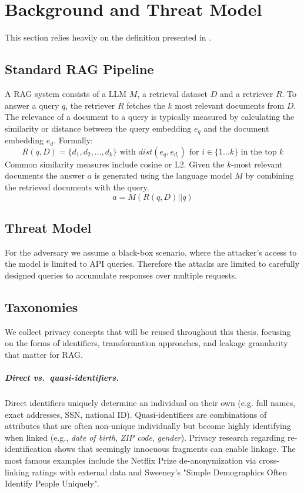 \chapter{Background and Threat Model}\label{chapter:background}
This section relies heavily on the definition presented in \cite{goodAndBad}.

\section{Standard RAG Pipeline}
A \ac{RAG} system consists of a \ac{LLM} $M$, a retrieval dataset $D$ and a retriever $R$. To answer a query $q$, the retriever $R$ fetches the $k$ most relevant documents from $D$. The relevance of a document to a query is typically measured by calculating the similarity or distance between the query embedding $e_q$ and the document embedding $e_d$. Formally:
\[R(q,D) = \{d_1,d_2,..., d_k\} \mbox{ with } dist(e_q, e_{d_i}) \mbox{ for } i \in \{1...k\} \mbox{ in the top } k\]
Common similarity measures include cosine or L2. Given the $k$-most relevant documents the answer $a$ is generated using the language model $M$ by combining the retrieved documents with the query. $$a = M(R(q,D)\vert\vert q)$$

\section{Threat Model}\label{background-sec:threat-model}
For the adversary we assume a black-box scenario, where the attacker's access to the model is limited to API queries. Therefore the attacks are limited to carefully designed queries to accumulate responses over multiple requests.

\section{Taxonomies}
We collect privacy concepts that will be reused throughout this thesis, focusing on the forms of identifiers, transformation approaches, and leakage granularity that matter for \ac{RAG}.

\paragraph{Direct vs.\ quasi-identifiers.}
Direct identifiers uniquely determine an individual on their own (e.g. full names, exact addresses, SSN, national ID). Quasi-identifiers are combinations of attributes that are often non-unique individually but become highly identifying when linked (e.g., \textit{date of birth}, \textit{ZIP code}, \textit{gender}). Privacy research regarding re-identification shows that seemingly innocuous fragments can enable linkage. The most famous examples include the Netflix Prize de-anonymization via cross-linking ratings with external data and Sweeney's "Simple Demographics Often Identify People Uniquely". \cite{netflixDeAnon}\cite{simpleDemographic}

